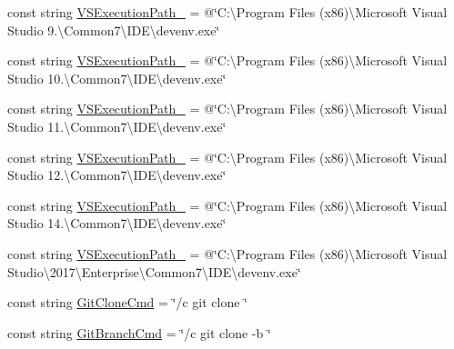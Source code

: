 \begin{DoxyCompactItemize}
const string \mbox{\hyperlink{class_get_repo_cmdlet_1_1_const_mgr_adae487ce6c7ccaa6f217f3412af1b6ab}{V\+S\+Execution\+Path\+\_}} = @\char`\"{}C\+:\textbackslash{}\+Program Files (x86)\textbackslash{}Microsoft Visual Studio 9.\textbackslash{}Common7\textbackslash{}\+I\+D\+E\textbackslash{}devenv.\+exe\char`\"{}
\item 
const string \mbox{\hyperlink{class_get_repo_cmdlet_1_1_const_mgr_a0ad5d48840d47b19a4fc3de6bfbb8fa3}{V\+S\+Execution\+Path\+\_}} = @\char`\"{}C\+:\textbackslash{}\+Program Files (x86)\textbackslash{}Microsoft Visual Studio 10.\textbackslash{}Common7\textbackslash{}\+I\+D\+E\textbackslash{}devenv.\+exe\char`\"{}
\item 
const string \mbox{\hyperlink{class_get_repo_cmdlet_1_1_const_mgr_a8f10ba1487397a7ec1841e4f57fcd241}{V\+S\+Execution\+Path\+\_}} = @\char`\"{}C\+:\textbackslash{}\+Program Files (x86)\textbackslash{}Microsoft Visual Studio 11.\textbackslash{}Common7\textbackslash{}\+I\+D\+E\textbackslash{}devenv.\+exe\char`\"{}
\item 
const string \mbox{\hyperlink{class_get_repo_cmdlet_1_1_const_mgr_a18461eb6aee2c965490537d4163b90fe}{V\+S\+Execution\+Path\+\_}} = @\char`\"{}C\+:\textbackslash{}\+Program Files (x86)\textbackslash{}Microsoft Visual Studio 12.\textbackslash{}Common7\textbackslash{}\+I\+D\+E\textbackslash{}devenv.\+exe\char`\"{}
\item 
const string \mbox{\hyperlink{class_get_repo_cmdlet_1_1_const_mgr_a01df29a09d743d91af177b63d2fed473}{V\+S\+Execution\+Path\+\_}} = @\char`\"{}C\+:\textbackslash{}\+Program Files (x86)\textbackslash{}Microsoft Visual Studio 14.\textbackslash{}Common7\textbackslash{}\+I\+D\+E\textbackslash{}devenv.\+exe\char`\"{}
\item 
const string \mbox{\hyperlink{class_get_repo_cmdlet_1_1_const_mgr_aa4d550380f95a4ffd9ce96bc17c34dd8}{V\+S\+Execution\+Path\+\_}} = @\char`\"{}C\+:\textbackslash{}\+Program Files (x86)\textbackslash{}Microsoft Visual Studio\textbackslash{}2017\textbackslash{}\+Enterprise\textbackslash{}\+Common7\textbackslash{}\+I\+D\+E\textbackslash{}devenv.\+exe\char`\"{}
\item 
const string \mbox{\hyperlink{class_get_repo_cmdlet_1_1_const_mgr_ad1db12b1d1ed53a02a275dc619e7164b}{Git\+Clone\+Cmd}} = \char`\"{}/c git clone \char`\"{}
\item 
const string \mbox{\hyperlink{class_get_repo_cmdlet_1_1_const_mgr_afd4753e7427db6284f1c70072f85f56f}{Git\+Branch\+Cmd}} = \char`\"{}/c git clone -\/b \char`\"{}

\end{DoxyCompactItemize}
